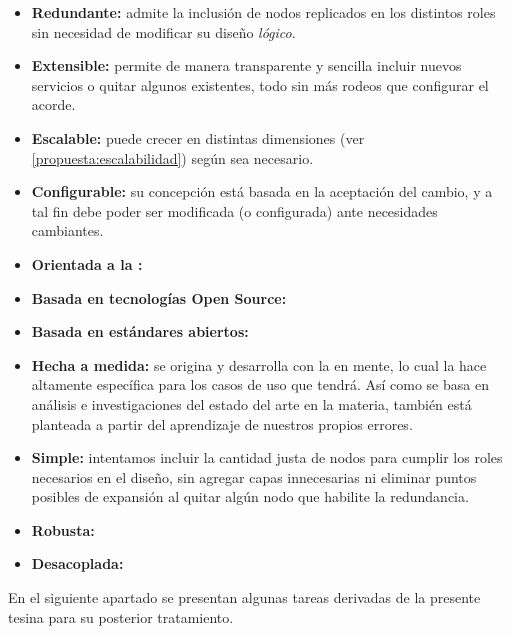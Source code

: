 \begin{itemize}
  \item \textbf{Redundante:} admite la inclusión de nodos replicados en los distintos roles sin necesidad de modificar su diseño \textit{lógico}.
  \item \textbf{Extensible:} permite de manera transparente y sencilla incluir nuevos servicios o quitar algunos existentes, todo sin más rodeos que configurar el  acorde.
  \item \textbf{Escalable:} puede crecer en distintas dimensiones (ver \autoref{propuesta:escalabilidad}) según sea necesario.
  \item \textbf{Configurable:} su concepción está basada en la aceptación del cambio, y a tal fin debe poder ser modificada (o configurada) ante necesidades cambiantes.
  \item \textbf{Orientada a la :}
  \item \textbf{Basada en tecnologías Open Source:}
  \item \textbf{Basada en estándares abiertos:}
  \item \textbf{Hecha a medida:} se origina y desarrolla con la {\cloud} en mente, lo cual la hace altamente específica para los casos de uso que tendrá. Así como se basa en análisis e investigaciones del estado del arte en la materia, también está planteada a partir del aprendizaje de nuestros propios errores.
  \item \textbf{Simple:} intentamos incluir la cantidad justa de nodos para cumplir los roles necesarios en el diseño, sin agregar capas innecesarias ni eliminar puntos posibles de expansión al quitar algún nodo que habilite la redundancia.
  \item \textbf{Robusta:}
  \item \textbf{Desacoplada:}
\end{itemize}

En el siguiente apartado se presentan algunas tareas derivadas de la presente tesina para su posterior tratamiento.
